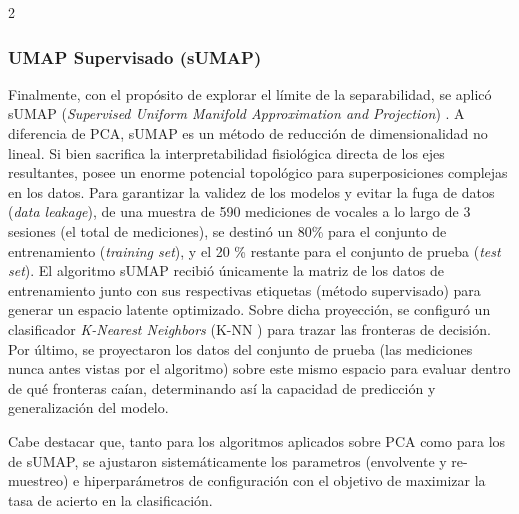 \documentclass[11pt, letterpaper]{article}
\begin{document}
\begin{multicols*}{2}
\subsubsection*{UMAP Supervisado (sUMAP)}
  
Finalmente, con el propósito de explorar el límite de la separabilidad, se aplicó sUMAP (\textit{Supervised Uniform Manifold Approximation and Projection}) \cite{umap}. A diferencia de PCA, sUMAP es un método de reducción de dimensionalidad no lineal. Si bien sacrifica la interpretabilidad fisiológica directa de los ejes resultantes, posee un enorme potencial topológico para  superposiciones complejas en los datos. Para garantizar la validez de los modelos y evitar la fuga de datos (\textit{data leakage}), de una muestra de 590 mediciones de vocales a lo largo de 3 sesiones (el total de mediciones), se destinó un 80\% para el conjunto de entrenamiento (\textit{training set}), y el 20 \% restante para el conjunto de prueba (\textit{test set}). El algoritmo sUMAP recibió únicamente la matriz de los datos de entrenamiento junto con sus respectivas etiquetas (método supervisado) para generar un espacio latente optimizado. Sobre dicha proyección, se configuró un clasificador \textit{K-Nearest Neighbors} (K-NN \cite{hastie2009}) para trazar las fronteras de decisión. Por último, se proyectaron los datos del conjunto de prueba (las mediciones nunca antes vistas por el algoritmo) sobre este mismo espacio para evaluar dentro de qué fronteras caían, determinando así la capacidad de predicción y generalización del modelo.
             
Cabe destacar que, tanto para los algoritmos aplicados sobre PCA como para los de sUMAP, se ajustaron sistemáticamente los parametros (envolvente y re-muestreo) e hiperparámetros de configuración con el objetivo de maximizar la tasa de acierto en la clasificación.


\end{multicols*}
\end{document}

